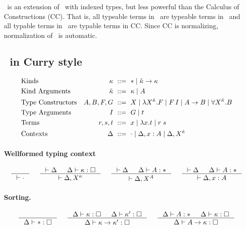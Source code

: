\section{\Fi}
\Fi\ is an extension of \Fw\ with indexed types, but less powerful than
the Calculus of Constructions (CC). That is, all typeable terms in \Fi\ are
typeable terms in \Fi\ and all typable terms in \Fi\ are typable terms in CC.
Since CC is normalizing, normalization of \Fi\ is automatic.

\subsection{\Fi\ in Curry style}

\begin{align*}
&\text{Kinds}
 	& \kappa		&~ ::= ~ *
				\mid {\check\kappa} -> \kappa
\\
&\text{Kind Arguments}
 	& {\check\kappa}		&~ ::= ~ \kappa \mid A
\\
&\text{Type Constructors}
	& A,B,F,G		&~ ::= ~ X
				\mid \lambda X^{\check\kappa}.F
				\mid F\,I
				\mid A-> B
				\mid \forall X^{\check\kappa} . B
\\
&\text{Type Arguments}
	& I			&~ ::= ~ G \mid t
\\
&\text{Terms}
	& r,s,t			&~ ::= ~ x \mid \lambda x.t \mid r\;s
\\
&\text{Contexts}
	& \Delta		&~ ::= ~ \cdot
				\mid \Delta, x : A
				\mid \Delta, X^{\check\kappa}
\end{align*}

\paragraph{Wellformed typing context}
\[ \inference{}{|- \cdot}
 ~~~~
   \inference{|- \Delta & \Delta |- \kappa:\square}{|- \Delta,X^\kappa}
 ~~~~
   \inference{|- \Delta & \Delta |- A:*}{|- \Delta,X^A}
 ~~~~
   \inference{|- \Delta & \Delta |- A:*}{|- \Delta,x:A}
\]

\paragraph{Sorting.}
\[ \inference{}{\Delta |- *:\square}
 ~~~~
   \inference{\Delta |- \kappa:\square & \Delta |- \kappa':\square}
             {\Delta |- \kappa -> \kappa' : \square}
 ~~~~
   \inference{\Delta |- A:* & \Delta |- \kappa:\square}
             {\Delta |- A -> \kappa : \square}
\]
